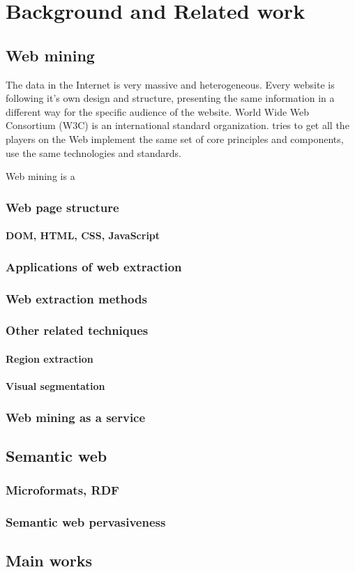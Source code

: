 \chapter{Background and Related work}
\label{chap:background}
\section{Web mining}

The data in the Internet is very massive and heterogeneous. Every website is following it's own design and structure, presenting the same information in a different way for the specific audience of the website. World Wide Web Consortium (W3C) is an international standard organization. tries to get all the players on the Web implement the same set of core principles and components, use the same technologies and standards. 

Web mining is a 
\subsection{Web page structure}
\subsubsection{DOM, HTML, CSS, JavaScript}
\subsection{Applications of web extraction}
\subsection{Web extraction methods}
\subsection{Other related techniques}
\subsubsection{Region extraction}
\subsubsection{Visual segmentation}
\subsection{Web mining as a service}
\section{Semantic web}
\subsection{Microformats, RDF}
\subsection{Semantic web pervasiveness}
\section{Main works}


